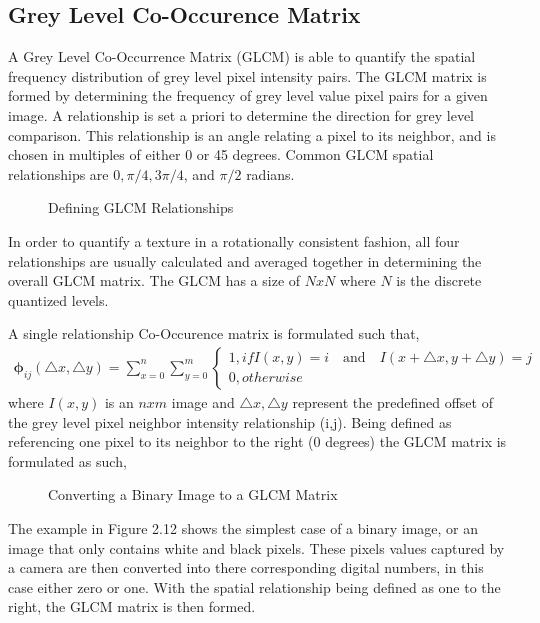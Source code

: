 \subsection{Grey Level Co-Occurence Matrix}
A Grey Level Co-Occurrence Matrix (GLCM) is able to quantify the spatial frequency distribution of grey level pixel intensity pairs. The GLCM matrix is formed by determining the frequency of grey level value pixel pairs for a given image.  A relationship is set a priori to determine the direction for grey level comparison.  This relationship is an angle relating a pixel to its neighbor, and is chosen in multiples of either 0 or 45 degrees.  Common GLCM spatial relationships are $0, \pi/4, 3\pi/4$, and $\pi/2$ radians.
%
\begin{figure}[!htb]
    \begin{center}
    \end{center}
    \caption{Defining GLCM Relationships}
    \label{fig:texture}
\end{figure}
%
In order to quantify a texture in a rotationally consistent fashion, all four relationships are usually calculated and averaged together in determining the overall GLCM matrix.  The GLCM has a size of $N x N$ where $N$ is the discrete quantized levels.

A single relationship Co-Occurence matrix is formulated such that,
%
\begin{align}
    \mathbf{\phi}_{ij}(\triangle x,\triangle y) = \sum_{x=0}^{n}\sum_{y=0}^{m}
    \begin{cases}
        1, if I(x,y) = i \quad \textrm{and} \quad  I(x+\triangle x,y+\triangle y) = j \\
        0, otherwise
    \end{cases}
\end{align}
%
where $I(x,y)$ is an $n x m$ image and $\triangle x,\triangle y$ represent the predefined offset of the grey level pixel neighbor intensity relationship (i,j).
Being defined as referencing one pixel to its neighbor to the right (0 degrees) the GLCM matrix is formulated as such,
%
\begin{figure}[!htb]
    \begin{center}
    \end{center}
    \caption{Converting a Binary Image to a GLCM Matrix}
    \label{fig:texture}
\end{figure}
The example in Figure 2.12 shows the simplest case of a binary image, or an image that only contains white and black pixels.  These pixels values captured by a camera are then converted into there corresponding digital numbers, in this case either zero or one.  With the spatial relationship being defined as one to the right, the GLCM matrix is then formed.

